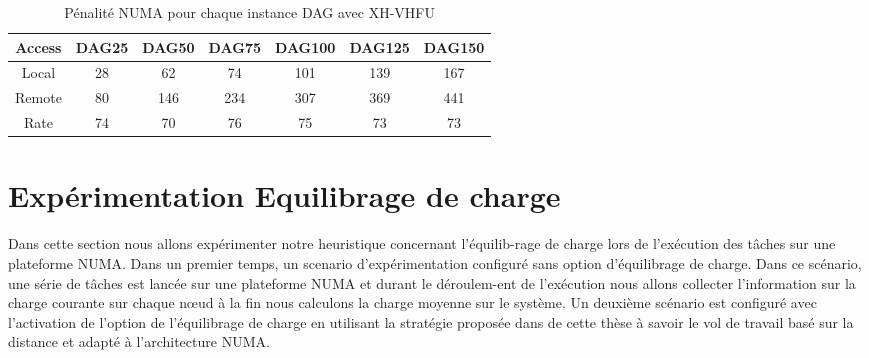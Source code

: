 \begin{table}%
\centering
\begin{tabular}{| c | c | c | c | c | c | c |} 
\hline
Access 		& DAG25 	& DAG50 	& DAG75 	& DAG100 	& DAG125  	& DAG150 \\ [0.5ex] \hline
Local 			& 28 	& 62 		& 74 		& 101 		& 139  		& 167 \\ [0.5ex] \hline
Remote 		& 80 	& 146 		& 234 		& 307 		& 369  		& 441 \\ [0.5ex] \hline
Rate 		& 74 		& 70 		& 76 		& 75 		& 73  		& 73 \\ [0.5ex] \hline
\hline
\end{tabular}
\caption{Pénalité NUMA pour chaque instance DAG avec XH-VHFU}
\label{table:TB_2_2223}
\end{table}
%
\newpage
\section{Expérimentation Equilibrage de charge} \label{eecar}
%
Dans cette section nous allons expérimenter notre heuristique concernant l'équilib-rage de charge lors de l'exécution des tâches sur une plateforme NUMA. Dans un premier temps, un scenario d'expérimentation configuré sans option d'équilibrage de charge. Dans ce scénario, une série de tâches est lancée sur une plateforme NUMA et durant le déroulem-ent de l'exécution nous allons collecter l'information sur la charge courante sur chaque nœud à la fin nous calculons la charge moyenne sur le système. Un deuxième scénario est configuré avec l'activation de l'option de l'équilibrage de charge en utilisant la stratégie proposée dans de cette thèse à savoir le vol de travail basé sur la distance et adapté à l'architecture NUMA.%
